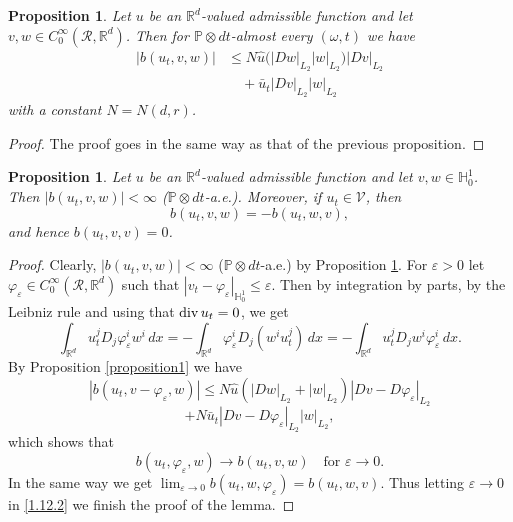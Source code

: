 \documentclass[11pt,reqno]{amsart}
\newtheorem{proposition}[theorem]{Proposition}
\theoremstyle{definition}
\theoremstyle{remark}
\newcommand\bH{\mathbb{H}}
\newcommand\bR{\mathbb{R}}
\newcommand\cR{\mathcal{R}}
\newcommand{\<}{\langle}
\renewcommand{\>}{\rangle}
\newcommand{\R}{\mathbb{R}}
\renewcommand{\P}{\mathbb{P}}
\begin{document}
\begin{proposition}
                             \label{proposition2}
Let $u$ be an $\R^d$-valued admissible function and let
$v,w\in C^{\infty}_0(\cR,\bR^d)$. 
Then for $\P\otimes dt$-almost every $(\omega,t)$ we have 
\begin{align}
|b(u_t,v,w)|&\leq N\hat u \big(|Dw|_{L_2}|w|_{L_2}\big)|Dv|_{L_2}  
                                                                                  \nonumber\\
&\quad+\bar u_t|Dv|_{L_2}|w|_{L_2}                         \nonumber
\end{align}
with a constant $N=N(d,r)$. 
\end{proposition}
\begin{proof}
The proof goes in the same way as that of the previous proposition.
\end{proof}

\begin{proposition}
                            \label{proposition antisymmetry}
Let $u$ be an $\mathbb R^d$-valued admissible function and let
$v,w\in \bH^1_0$. 
Then $|b(u_t,v,w)|<\infty$ \rm{($\P\otimes dt$-a.e.)}. 
Moreover, if $u_t\in\mathcal V$, 
then
\begin{equation*}
b(u_t,v,w)=-b(u_t,w,v), 
\end{equation*}
and hence $b(u_t,v,v)=0$. 
\end{proposition}
\begin{proof}
Clearly, $|b(u_t,v,w)|<\infty$ \rm{($\P\otimes dt$-a.e.)} 
by Proposition \ref{proposition2}. 
For $\varepsilon>0$ let 
$\varphi_{\varepsilon}\in C_0^{\infty}(\cR,\bR^d)$ such that 
$|v_t-\varphi_{\varepsilon}|_{\bH^1_0}\leq\varepsilon$. Then 
by integration by parts, by the Leibniz rule 
and using that ${\rm div}\, u_t=0$,  we get 
\begin{equation}
                                                                 \label{1.12.2}
\int_{\bR^d}u^j_tD_j\varphi^i_{\varepsilon}w^i\,dx
=-\int_{\bR^d}\varphi_{\varepsilon}^iD_j(w^iu_t^j)\,dx 
=-\int_{\bR^d}u^j_tD_jw^i\varphi_{\varepsilon}^i\,dx. 
\end{equation}
By Proposition \ref{proposition1} we have 
$$
|b(u_t,v-\varphi_{\varepsilon},w)|\leq N\hat u(|Dw|_{L_2}
+|w|_{L_2})|Dv-D\varphi_{\varepsilon}|_{L_2}
$$
$$ 
+N\bar u_t|Dv-D\varphi_{\varepsilon}|_{L_2}|w|_{L_2},  
$$
which shows that 
$$
b(u_t,\varphi_{\varepsilon},w)\to b(u_t,v,w)
\quad \text{for $\varepsilon\to0$}.
$$
In the same way we get 
$\lim_{\varepsilon\to0} b(u_t,w, \varphi_{\varepsilon})= b(u_t,w, v)$. 
Thus letting $\varepsilon\to0$ in \eqref{1.12.2} we finish the proof 
of the lemma. 
\end{proof}
\end{document}
